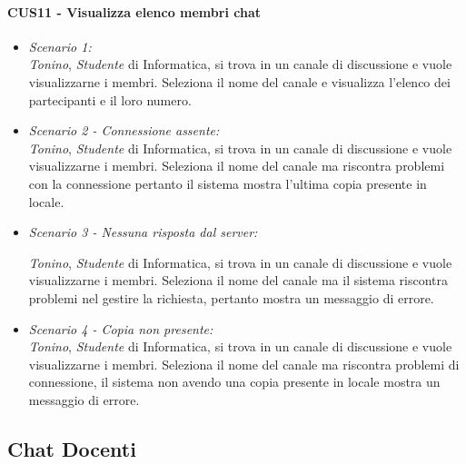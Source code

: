 \paragraph{CUS11 - Visualizza elenco membri chat\\}
\begin{itemize}
	\item \textit{Scenario 1:\\}
	\textit{Tonino}, \textit{Studente} di Informatica, si trova in un canale di discussione e vuole visualizzarne i membri. Seleziona il nome del canale e visualizza l’elenco dei partecipanti e il loro numero.\\
	
	\item \textit{Scenario 2 - Connessione assente:\\}
	\textit{Tonino}, \textit{Studente} di Informatica, si trova in un canale di discussione e vuole visualizzarne i membri. Seleziona il nome del canale ma riscontra problemi con la connessione pertanto il sistema mostra l’ultima copia presente in locale.\\
	
	\item \textit{Scenario 3 - Nessuna risposta dal server:\\}
	
	\textit{Tonino}, \textit{Studente} di Informatica, si trova in un canale di discussione e vuole visualizzarne i membri. Seleziona il nome del canale ma il sistema riscontra problemi nel gestire la richiesta, pertanto mostra un messaggio di errore.\\
	
	\item \textit{Scenario 4 - Copia non presente:\\}
	\textit{Tonino}, \textit{Studente} di Informatica, si trova in un canale di discussione e vuole visualizzarne i membri. Seleziona il nome del canale ma riscontra problemi di connessione, il sistema non avendo una copia presente in locale mostra un messaggio di errore.\\
\end{itemize}

\subsection{Chat Docenti}

